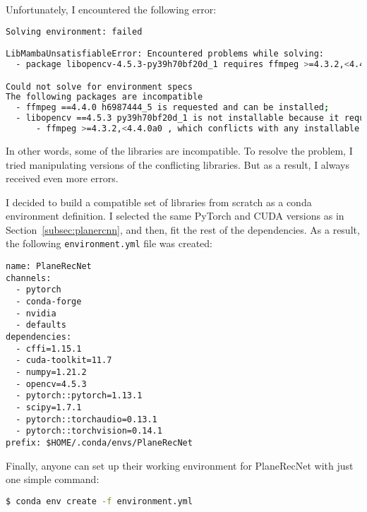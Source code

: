 Unfortunately, I encountered the following error:
\begin{lstlisting}[language=bash]
Solving environment: failed

LibMambaUnsatisfiableError: Encountered problems while solving:
  - package libopencv-4.5.3-py39h70bf20d_1 requires ffmpeg >=4.3.2,<4.4.0a0, but none of the providers can be installed

Could not solve for environment specs
The following packages are incompatible
  - ffmpeg ==4.4.0 h6987444_5 is requested and can be installed;
  - libopencv ==4.5.3 py39h70bf20d_1 is not installable because it requires
      - ffmpeg >=4.3.2,<4.4.0a0 , which conflicts with any installable versions previously reported.
\end{lstlisting}

In other words, some of the libraries are incompatible.
To resolve the problem, I tried manipulating versions of the conflicting libraries.
But as a result, I always received even more errors.

\par

I decided to build a compatible set of libraries from scratch as a conda environment definition.
I selected the same PyTorch and CUDA versions as in Section~\ref{subsec:planercnn},
and then, fit the rest of the dependencies.
As a result, the following \texttt{environment.yml} file was created:
\begin{lstlisting}[style=yaml]
name: PlaneRecNet
channels:
  - pytorch
  - conda-forge
  - nvidia
  - defaults
dependencies:
  - cffi=1.15.1
  - cuda-toolkit=11.7
  - numpy=1.21.2
  - opencv=4.5.3
  - pytorch::pytorch=1.13.1
  - scipy=1.7.1
  - pytorch::torchaudio=0.13.1
  - pytorch::torchvision=0.14.1
prefix: $HOME/.conda/envs/PlaneRecNet  
\end{lstlisting}

Finally, anyone can set up their working environment for PlaneRecNet with just one simple command:
\begin{lstlisting}[language=bash]
$ conda env create -f environment.yml
\end{lstlisting}
